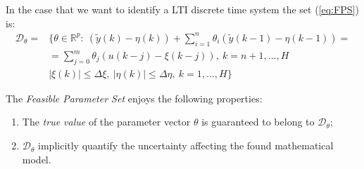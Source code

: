 \hspace*{-5mm}
%

\noindent
In the case that we want to identify a LTI discrete time system the set (\ref{eq:FPS}) is:
{\large{
    \begin{equation}
        \begin{aligned}
            \mathcal{D}_\theta =&\{
                \theta\in\mathbb{R}^p: \ 
                (\tilde{y}(k)-\eta(k))+
                \sum_{i=1}^n {\theta_i (\tilde{y}(k-1)-\eta(k-1))} =\\ &=\sum_{j=0}^m {\theta_j} (u(k-j)-\xi(k-j)), \ k=n+1, ..., H \\
                &\vert \xi(k) \vert \le \Delta\xi, \ 
                \vert \eta(k) \vert \le \Delta\eta, \ 
                k=1,...,H
            \}
        \end{aligned}
    \end{equation}    
}}

\noindent
The \textit{Feasible Parameter Set} enjoys the following properties:
\begin{enumerate}
    \itemsep0em
    \item The \textit{true value} of the parameter vector $\theta$ is guaranteed to belong to $\mathcal{D}_\theta$; 
    \item $\mathcal{D}_\theta$ implicitly quantify the uncertainty affecting the found mathematical model.
\end{enumerate}

